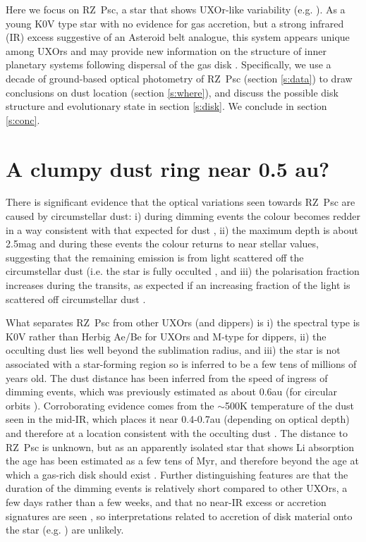 \documentclass[]{rsos}
\begin{document}
Here we focus on RZ~Psc, a star that shows UXOr-like variability
(e.g. \cite{1985PZ.....22..181Z,1999A&AS..140..293G,2003ARep...47..580S}). As a young
K0V type star with no evidence for gas accretion, but a strong infrared (IR) excess
suggestive of an Asteroid belt analogue, this system appears unique among UXOrs and may
provide new information on the structure of inner planetary systems following dispersal
of the gas disk \cite{2010A&A...524A...8G,2013A&A...553L...1D}. Specifically, we use a
decade of ground-based optical photometry of RZ~Psc (section \ref{s:data}) to draw
conclusions on dust location (section \ref{s:where}), and discuss the possible disk
structure and evolutionary state in section \ref{s:disk}. We conclude in section
\ref{s:conc}.

\section{A clumpy dust ring near 0.5 au?}\label{s:rzpscintro}

There is significant evidence that the optical variations seen towards RZ~Psc are caused
by circumstellar dust: i) during dimming events the colour becomes redder
\cite{1985PZ.....22..181Z,1980PZ.....21..310K} in a way consistent with that expected for
dust \cite{1981Afz....17...87P,2004ARep...48..470P}, ii) the maximum depth is about
2.5mag and during these events the colour returns to near stellar values, suggesting that
the remaining emission is from light scattered off the circumstellar dust (i.e. the star
is fully occulted \cite{1981Afz....17...87P,1988SvAL...14...27G}, and iii) the
polarisation fraction increases during the transits, as expected if an increasing
fraction of the light is scattered off circumstellar dust
\cite{1988SvAL...14...27G,1991Afz....34..333K,2003ARep...47..580S}.

What separates RZ~Psc from other UXOrs (and dippers) is i) the spectral type is K0V
rather than Herbig Ae/Be for UXOrs and M-type for dippers, ii) the occulting dust lies
well beyond the sublimation radius, and iii) the star is not associated with a
star-forming region so is inferred to be a few tens of millions of years old. The dust
distance has been inferred from the speed of ingress of dimming events, which was
previously estimated as about 0.6au (for circular orbits
\cite{2013A&A...553L...1D}). Corroborating evidence comes from the $\sim$500K temperature
of the dust seen in the mid-IR, which places it near 0.4-0.7au (depending on optical
depth) and therefore at a location consistent with the occulting dust
\cite{2013A&A...553L...1D}. The distance to RZ~Psc is unknown, but as an apparently
isolated star that shows Li absorption the age has been estimated as a few tens of Myr,
and therefore beyond the age at which a gas-rich disk should exist
\cite{2010A&A...524A...8G,2014A&A...563A.139P}. Further distinguishing features are that
the duration of the dimming events is relatively short compared to other UXOrs, a few
days rather than a few weeks, and that no near-IR excess or accretion signatures are seen
\cite{2014A&A...563A.139P}, so interpretations related to accretion of disk material onto
the star (e.g. \cite{1999AJ....118.1043H,1999A&A...349..619B,2016arXiv160503985B}) are
unlikely.
\end{document}
